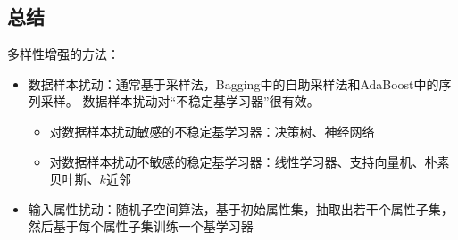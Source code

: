 
\subsection{总结}
多样性增强的方法：
\begin{itemize}
	\item 数据样本扰动：通常基于采样法，Bagging中的自助采样法和AdaBoost中的序列采样。
	数据样本扰动对“不稳定基学习器”很有效。
	\begin{itemize}
		\item 对数据样本扰动敏感的不稳定基学习器：决策树、神经网络
		\item 对数据样本扰动不敏感的稳定基学习器：线性学习器、支持向量机、朴素贝叶斯、$k$近邻
	\end{itemize}
	\item 输入属性扰动：随机子空间算法，基于初始属性集，抽取出若干个属性子集，然后基于每个属性子集训练一个基学习器
\end{itemize}